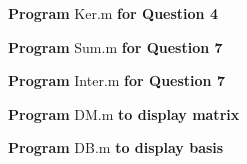 \documentclass[14pt]{extarticle}
\begin{document}
\begin{center}
\textbf{Program} Ker.m \textbf{for Question 4}
\end{center}


\begin{center}
\textbf{Program} Sum.m \textbf{for Question 7}
\end{center}


\begin{center}
\textbf{Program} Inter.m \textbf{for Question 7}
\end{center}

\pagebreak
\begin{center}
\textbf{Program} DM.m \textbf{to display matrix}
\end{center}


\begin{center}
\textbf{Program} DB.m \textbf{to display basis}
\end{center}

\end{document}
